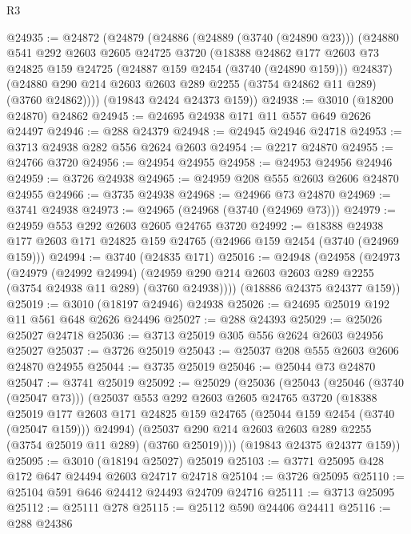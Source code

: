 \begin{lexlean}{R3}
\begin{coremodule}
@24935 := @24872
    (@24879
      (@24886
        (@24889 (@3740 (@24890 @23)))
        (@24880
          @541
          @292
          @2603
          @2605
          @24725
          @3720
          (@18388
            @24862
            @177
            @2603
            @73
            @24825
            @159
            @24725
            (@24887 @159 @2454 (@3740 (@24890 @159)))
            @24837)
          (@24880 @290 @214 @2603 @2603 @289 @2255 (@3754 @24862 @11 @289) (@3760 @24862))))
      (@19843 @2424 @24373 @159))
@24938 := @3010 (@18200 @24870) @24862
@24945 := @24695 @24938 @171 @11 @557 @649 @2626 @24497
@24946 := @288 @24379
@24948 := @24945 @24946 @24718
@24953 := @3713 @24938 @282 @556 @2624 @2603
@24954 := @2217 @24870
@24955 := @24766 @3720
@24956 := @24954 @24955
@24958 := @24953 @24956 @24946
@24959 := @3726 @24938
@24965 := @24959 @208 @555 @2603 @2606 @24870 @24955
@24966 := @3735 @24938
@24968 := @24966 @73 @24870
@24969 := @3741 @24938
@24973 := @24965 (@24968 (@3740 (@24969 @73)))
@24979 := @24959 @553 @292 @2603 @2605 @24765 @3720
@24992 := @18388 @24938 @177 @2603 @171 @24825 @159 @24765 (@24966 @159 @2454 (@3740 (@24969 @159)))
@24994 := @3740 (@24835 @171)
@25016 := @24948
    (@24958
      (@24973
        (@24979
          (@24992 @24994)
          (@24959 @290 @214 @2603 @2603 @289 @2255 (@3754 @24938 @11 @289) (@3760 @24938))))
      (@18886 @24375 @24377 @159))
@25019 := @3010 (@18197 @24946) @24938
@25026 := @24695 @25019 @192 @11 @561 @648 @2626 @24496
@25027 := @288 @24393
@25029 := @25026 @25027 @24718
@25036 := @3713 @25019 @305 @556 @2624 @2603 @24956 @25027
@25037 := @3726 @25019
@25043 := @25037 @208 @555 @2603 @2606 @24870 @24955
@25044 := @3735 @25019
@25046 := @25044 @73 @24870
@25047 := @3741 @25019
@25092 := @25029
    (@25036
      (@25043
        (@25046 (@3740 (@25047 @73)))
        (@25037
          @553
          @292
          @2603
          @2605
          @24765
          @3720
          (@18388
            @25019
            @177
            @2603
            @171
            @24825
            @159
            @24765
            (@25044 @159 @2454 (@3740 (@25047 @159)))
            @24994)
          (@25037 @290 @214 @2603 @2603 @289 @2255 (@3754 @25019 @11 @289) (@3760 @25019))))
      (@19843 @24375 @24377 @159))
@25095 := @3010 (@18194 @25027) @25019
@25103 := @3771 @25095 @428 @172 @647 @24494 @2603 @24717 @24718
@25104 := @3726 @25095
@25110 := @25104 @591 @646 @24412 @24493 @24709 @24716
@25111 := @3713 @25095
@25112 := @25111 @278
@25115 := @25112 @590 @24406 @24411
@25116 := @288 @24386

\end{coremodule}
\end{lexlean}
